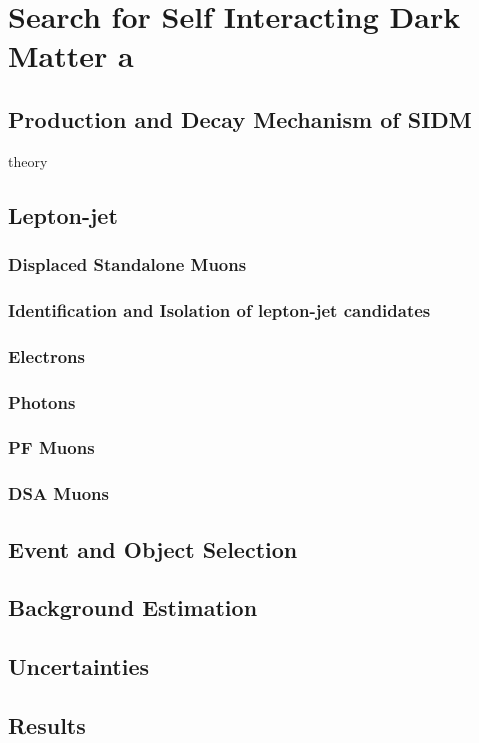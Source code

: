 \chapter{Search for Self Interacting Dark Matter a}\label{ch:analyisis}
\section{Production and Decay Mechanism of SIDM}
theory
\section{Lepton-jet}
\subsection{Displaced Standalone Muons}
\subsection{Identification and Isolation of lepton-jet candidates}
\subsection{Electrons}
\subsection{Photons}
\subsection{PF Muons}
\subsection{DSA Muons}
\section{Event and Object Selection}
\section{Background Estimation}
\section{Uncertainties}
\section{Results}



